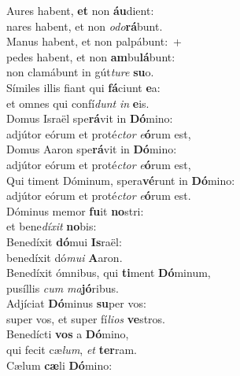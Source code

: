 \evenverse Aures habent, \textbf{et} non \textbf{áu}dient:~\*\\
\evenverse nares habent, et non \textit{o}\textit{do}\textbf{rá}bunt.\\
\oddverse Manus habent, et non palpábunt:~+\\
\oddverse  pedes habent, et non \textbf{am}bu\textbf{lá}bunt:~\*\\
\oddverse non clamábunt in gút\textit{tu}\textit{re} \textbf{su}o.\\
\evenverse Símiles illis fiant qui \textbf{fá}ciunt \textbf{e}a:~\*\\
\evenverse et omnes qui confí\textit{dunt} \textit{in} \textbf{e}is.\\
\oddverse Domus Israël spe\textbf{rá}vit in \textbf{Dó}mino:~\*\\
\oddverse adjútor eórum et proté\textit{ctor} \textit{e}\textbf{ó}rum est,\\
\evenverse Domus Aaron spe\textbf{rá}vit in \textbf{Dó}mino:~\*\\
\evenverse adjútor eórum et proté\textit{ctor} \textit{e}\textbf{ó}rum est,\\
\oddverse Qui timent Dóminum, spera\textbf{vé}runt in \textbf{Dó}mino:~\*\\
\oddverse adjútor eórum et proté\textit{ctor} \textit{e}\textbf{ó}rum est.\\
\evenverse Dóminus memor \textbf{fu}it \textbf{no}stri:~\*\\
\evenverse et bene\textit{dí}\textit{xit} \textbf{no}bis:\\
\oddverse Benedíxit \textbf{dó}mui \textbf{Is}raël:~\*\\
\oddverse benedíxit dó\textit{mu}\textit{i} \textbf{A}aron.\\
\evenverse Benedíxit ómnibus, qui \textbf{ti}ment \textbf{Dó}minum,~\*\\
\evenverse pusíllis \textit{cum} \textit{ma}\textbf{jó}ribus.\\
\oddverse Adjíciat \textbf{Dó}minus \textbf{su}per vos:~\*\\
\oddverse super vos, et super fí\textit{li}\textit{os} \textbf{ve}stros.\\
\evenverse Benedícti \textbf{vos} a \textbf{Dó}mino,~\*\\
\evenverse qui fecit cæ\textit{lum}, \textit{et} \textbf{ter}ram.\\
\oddverse Cælum \textbf{cæ}li \textbf{Dó}mino:~\*\\
